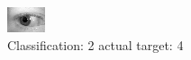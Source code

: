 \begin{figure}[h!]
\begin{center}
\includegraphics[width=0.60\columnwidth]{figures/ID828_class_2_target_4.png}
\end{center}
\caption{ Classification: 2 actual target: 4}
\label{fig:ID828_class_2_target_4}
\end{figure}
